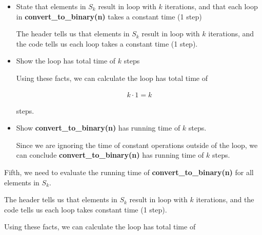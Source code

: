 \documentclass[12pt]{article}
\begin{document}
\begin{enumerate}[a.]
\begin{mdframed}
\begin{enumerate}[1.]
        \bigskip

        \begin{itemize}
            \item State that elements in $S_k$ result in loop with $k$ iterations, and
            that each loop in \textbf{convert\_to\_binary(n)} takes
            a constant time (1 step)

            \begin{mdframed}
            The header tells us that elements in $S_k$ result in loop with $k$ iterations, and
            the code tells us each loop takes a constant time (1 step).
            \end{mdframed}

            \item Show the loop has total time of $k$ steps

            \begin{mdframed}
            Using these facts, we can calculate the loop has total time of

            \begin{align}
                k \cdot 1 = k
            \end{align}

            steps.
            \end{mdframed}

            \item Show \textbf{convert\_to\_binary(n)} has running time of $k$ steps.

            \begin{mdframed}
            Since we are ignoring the time of constant operations outside of the loop,
            we can conclude \textbf{convert\_to\_binary(n)} has running time of $k$ steps.
            \end{mdframed}
        \end{itemize}

        \begin{mdframed}

        Fifth, we need to evaluate the running time of \textbf{convert\_to\_binary(n)}
        for all elements in $S_k$.

        \bigskip

        The header tells us that elements in $S_k$ result in loop with $k$ iterations, and
        the code tells us each loop takes constant time (1 step).

        \bigskip

        Using these facts, we can calculate the loop has total time of


\end{mdframed}
\end{enumerate}
\end{mdframed}
\end{enumerate}
\end{document}
